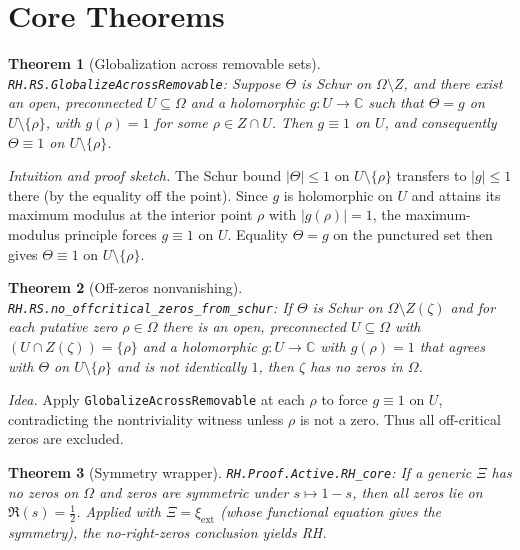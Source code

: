 \documentclass[11pt]{article}
\theoremstyle{plain}
\newtheorem{theorem}{Theorem}[section]
\theoremstyle{definition}
\begin{document}
\section{Core Theorems}
\label{sec:core}

\begin{theorem}[Globalization across removable sets]
\label{thm:globalize}
\texttt{RH.RS.GlobalizeAcrossRemovable}: Suppose \(\Theta\) is Schur on \(\Omega\setminus Z\), and there exist an open, preconnected \(U\subseteq \Omega\) and a holomorphic \(g:U\to\mathbb{C}\) such that \(\Theta=g\) on \(U\setminus\{\rho\}\), with \(g(\rho)=1\) for some \(\rho\in Z\cap U\). Then \(g\equiv 1\) on \(U\), and consequently \(\Theta\equiv 1\) on \(U\setminus\{\rho\}\).
\end{theorem}

\emph{Intuition and proof sketch.}
The Schur bound \(|\Theta|\le 1\) on \(U\setminus\{\rho\}\) transfers to \(|g|\le 1\) there (by the equality off the point). Since \(g\) is holomorphic on \(U\) and attains its maximum modulus at the interior point \(\rho\) with \(|g(\rho)|=1\), the maximum-modulus principle forces \(g\equiv 1\) on \(U\). Equality \(\Theta=g\) on the punctured set then gives \(\Theta\equiv 1\) on \(U\setminus\{\rho\}\).

\begin{theorem}[Off-zeros nonvanishing]
\label{thm:offzeros}
\texttt{RH.RS.no\_offcritical\_zeros\_from\_schur}: If \(\Theta\) is Schur on \(\Omega\setminus Z(\zeta)\) and for each putative zero \(\rho\in \Omega\) there is an open, preconnected \(U\subseteq \Omega\) with \((U\cap Z(\zeta))=\{\rho\}\) and a holomorphic \(g:U\to\mathbb{C}\) with \(g(\rho)=1\) that agrees with \(\Theta\) on \(U\setminus\{\rho\}\) and is not identically \(1\), then \(\zeta\) has no zeros in \(\Omega\).
\end{theorem}

\emph{Idea.}
Apply \texttt{GlobalizeAcrossRemovable} at each \(\rho\) to force \(g\equiv 1\) on \(U\), contradicting the nontriviality witness unless \(\rho\) is not a zero. Thus all off-critical zeros are excluded.

\begin{theorem}[Symmetry wrapper]
\label{thm:symmetry}
\texttt{RH.Proof.Active.RH\_core}: If a generic \(\Xi\) has no zeros on \(\Omega\) and zeros are symmetric under \(s\mapsto 1-s\), then all zeros lie on \(\Re(s)=\tfrac12\). Applied with \(\Xi=\xi_{\mathrm{ext}}\) (whose functional equation gives the symmetry), the no-right-zeros conclusion yields RH.
\end{theorem}
\end{document}
